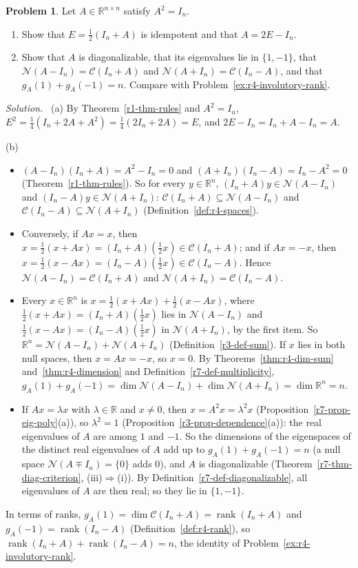 \documentclass[12pt]{article}
\newcommand{\R}{\mathbb R}
\DeclareMathOperator{\rank}{rank}
\theoremstyle{definition}
\newtheorem{problem}{Problem}
\newenvironment{solution}{\par\noindent\textit{Solution.}\ }{\par\smallskip}
\begin{document}
\begin{problem}\label{r7-pr-involution}
Let \(A\in\R^{n\times n}\) satisfy \(A^2=I_n\).
\begin{enumerate}
\item Show that \(E=\frac12(I_n+A)\) is idempotent and that \(A=2E-I_n\).
\item Show that \(A\) is diagonalizable, that its eigenvalues lie in \(\{1,-1\}\), that \(\mathcal N(A-I_n)=\mathcal C(I_n+A)\)
and \(\mathcal N(A+I_n)=\mathcal C(I_n-A)\), and that \(g_A(1)+g_A(-1)=n\). Compare with
Problem~\ref{ex:r4-involutory-rank}.
\end{enumerate}
\end{problem}
\begin{solution}
(a) By Theorem~\ref{r1-thm-rules} and \(A^2=I_n\), \(E^2=\frac14(I_n+2A+A^2)=\frac14(2I_n+2A)=E\), and
\(2E-I_n=I_n+A-I_n=A\).

(b)
\begin{itemize}
\item \((A-I_n)(I_n+A)=A^2-I_n=0\) and \((A+I_n)(I_n-A)=I_n-A^2=0\) (Theorem~\ref{r1-thm-rules}). So for every
\(y\in\R^n\), \((I_n+A)y\in\mathcal N(A-I_n)\) and \((I_n-A)y\in\mathcal N(A+I_n)\): \(\mathcal C(I_n+A)\subseteq\mathcal N(A-I_n)\)
and \(\mathcal C(I_n-A)\subseteq\mathcal N(A+I_n)\) (Definition~\ref{def:r4-spaces}).
\item Conversely, if \(Ax=x\), then \(x=\frac12(x+Ax)=(I_n+A)(\frac12x)\in\mathcal C(I_n+A)\); and if \(Ax=-x\), then
\(x=\frac12(x-Ax)=(I_n-A)(\frac12x)\in\mathcal C(I_n-A)\). Hence \(\mathcal N(A-I_n)=\mathcal C(I_n+A)\) and
\(\mathcal N(A+I_n)=\mathcal C(I_n-A)\).
\item Every \(x\in\R^n\) is \(x=\frac12(x+Ax)+\frac12(x-Ax)\), where \(\frac12(x+Ax)=(I_n+A)(\frac12x)\) lies in
\(\mathcal N(A-I_n)\) and \(\frac12(x-Ax)=(I_n-A)(\frac12x)\) in \(\mathcal N(A+I_n)\), by the first item. So
\(\R^n=\mathcal N(A-I_n)+\mathcal N(A+I_n)\) (Definition~\ref{r3-def-sum}). If \(x\) lies in both null spaces, then
\(x=Ax=-x\), so \(x=0\). By Theorems~\ref{thm:r4-dim-sum} and~\ref{thm:r4-dimension} and
Definition~\ref{r7-def-multiplicity}, \(g_A(1)+g_A(-1)=\dim\mathcal N(A-I_n)+\dim\mathcal N(A+I_n)=\dim\R^n=n\).
\item If \(Ax=\lambda x\) with \(\lambda\in\R\) and \(x\ne0\), then \(x=A^2x=\lambda^2x\)
(Proposition~\ref{r7-prop-eig-poly}(a)), so \(\lambda^2=1\) (Proposition~\ref{r3-prop-dependence}(a)): the real
eigenvalues of \(A\) are among \(1\) and \(-1\). So the dimensions of the eigenspaces of the distinct real eigenvalues of
\(A\) add up to \(g_A(1)+g_A(-1)=n\) (a null space \(\mathcal N(A\mp I_n)=\{0\}\) adds \(0\)), and \(A\) is diagonalizable
(Theorem~\ref{r7-thm-diag-criterion}, (iii)\(\Rightarrow\)(i)). By Definition~\ref{r7-def-diagonalizable}, all
eigenvalues of \(A\) are then real; so they lie in \(\{1,-1\}\).
\end{itemize}
In terms of ranks, \(g_A(1)=\dim\mathcal C(I_n+A)=\rank(I_n+A)\) and \(g_A(-1)=\rank(I_n-A)\)
(Definition~\ref{def:r4-rank}), so \(\rank(I_n+A)+\rank(I_n-A)=n\), the identity of Problem~\ref{ex:r4-involutory-rank}.
\end{solution}
\end{document}
